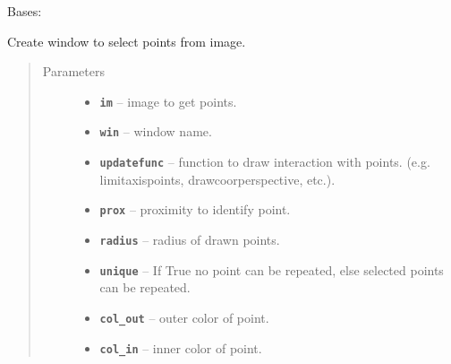 \documentclass[letterpaper,10pt,english]{sphinxmanual}
\begin{document}
\begin{fulllineitems}
\label{RRtoolbox.lib:RRtoolbox.lib.image.GetCoors}
Bases: {\hyperref[RRtoolbox.lib:RRtoolbox.lib.plotter.Plotim]{\emph{}}}

Create window to select points from image.
\begin{quote}\begin{description}
\item[{Parameters}] \leavevmode\begin{itemize}
\item {} 
\textbf{\texttt{im}} -- image to get points.

\item {} 
\textbf{\texttt{win}} -- window name.

\item {} 
\textbf{\texttt{updatefunc}} -- function to draw interaction with points.
(e.g. limitaxispoints, drawcoorperspective, etc.).

\item {} 
\textbf{\texttt{prox}} -- proximity to identify point.

\item {} 
\textbf{\texttt{radius}} -- radius of drawn points.

\item {} 
\textbf{\texttt{unique}} -- If True no point can be repeated,
else selected points can be repeated.

\item {} 
\textbf{\texttt{col\_out}} -- outer color of point.

\item {} 
\textbf{\texttt{col\_in}} -- inner color of point.

\end{itemize}

\end{description}\end{quote}

\begin{fulllineitems}
\label{RRtoolbox.lib:RRtoolbox.lib.image.GetCoors.coors}
\end{fulllineitems}


\end{fulllineitems}
\end{document}
